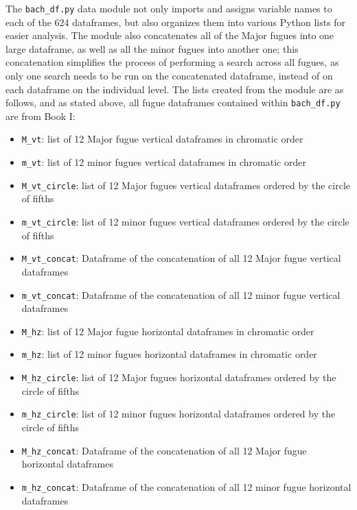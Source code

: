 The \texttt{bach\_df.py} data module not only imports and assigns
variable names to each of the 624 dataframes, but also organizes them
into various Python lists for easier analysis. The module also
concatenates all of the Major fugues into one large dataframe, as well
as all the minor fugues into another one; this concatenation simplifies
the process of performing a search across all fugues, as only one search
needs to be run on the concatenated dataframe, instead of on each
dataframe on the individual level. The lists created from the module are
as follows, and as stated above, all fugue dataframes contained within
\texttt{bach\_df.py} are from Book I:

\begin{itemize}
\tightlist
\item
  \texttt{M\_vt}: list of 12 Major fugue vertical dataframes in
  chromatic order
\item
  \texttt{m\_vt}: list of 12 minor fugues vertical dataframes in
  chromatic order
\item
  \texttt{M\_vt\_circle}: list of 12 Major fugues vertical dataframes
  ordered by the circle of fifths
\item
  \texttt{m\_vt\_circle}: list of 12 minor fugues vertical dataframes
  ordered by the circle of fifths
\item
  \texttt{M\_vt\_concat}: Dataframe of the concatenation of all 12 Major
  fugue vertical dataframes
\item
  \texttt{m\_vt\_concat}: Dataframe of the concatenation of all 12 minor
  fugue vertical dataframes 
\item
  \texttt{M\_hz}: list of 12 Major fugue horizontal dataframes in
  chromatic order
\item
  \texttt{m\_hz}: list of 12 minor fugues horizontal dataframes in
  chromatic order
\item
  \texttt{M\_hz\_circle}: list of 12 Major fugues horizontal dataframes
  ordered by the circle of fifths
\item
  \texttt{m\_hz\_circle}: list of 12 minor fugues horizontal dataframes
  ordered by the circle of fifths
\item
  \texttt{M\_hz\_concat}: Dataframe of the concatenation of all 12 Major
  fugue horizontal dataframes
\item
  \texttt{m\_hz\_concat}: Dataframe of the concatenation of all 12 minor
  fugue horizontal dataframes
\end{itemize}

